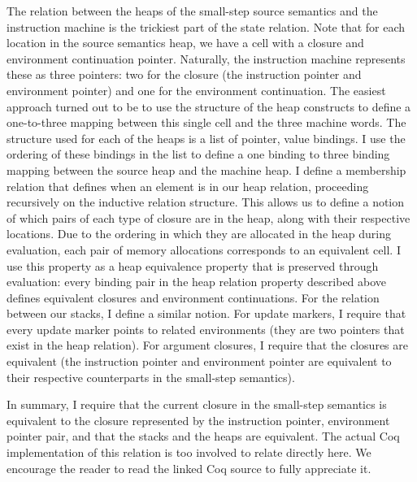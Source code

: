 The relation between the heaps of the small-step source semantics and the
instruction machine is the trickiest part of the state relation. Note that for
each location in the source semantics heap, we have a cell with a closure and
environment continuation pointer. Naturally, the instruction machine represents
these as three pointers: two for the closure (the instruction pointer and
environment pointer) and one for the environment continuation. The easiest
approach turned out to be to use the structure of the heap constructs to define a
one-to-three mapping between this single cell and the three machine words. The
structure used for each of the heaps is a list of pointer, value bindings.
I use the ordering of these bindings in the list to define a one binding to
three binding mapping between the source heap and the machine heap. I define 
a membership relation that defines when an element is in our heap relation,
proceeding recursively on the inductive relation structure. This allows us to
define a notion of which pairs of each type of closure are in the heap, along
with their respective locations. Due to the ordering in which they are allocated
in the heap during evaluation, each pair of memory allocations corresponds to an
equivalent cell. I use this property as a heap equivalence property that is
preserved through evaluation: every binding pair in the heap relation property
described above defines equivalent closures and environment continuations. For
the relation between our stacks, I define a similar notion.  For update
markers, I require that every update marker points to related environments
(they are two pointers that exist in the heap relation). For argument closures,
I require that the closures are equivalent (the instruction pointer and
environment pointer are equivalent to their respective counterparts in the
small-step semantics). 

In summary, I require that the current closure in the small-step semantics is
equivalent to the closure represented by the instruction pointer, environment
pointer pair, and that the stacks and the heaps are equivalent. The actual Coq
implementation of this relation is too involved to relate directly here. We
encourage the reader to read the linked Coq source to fully appreciate it.

